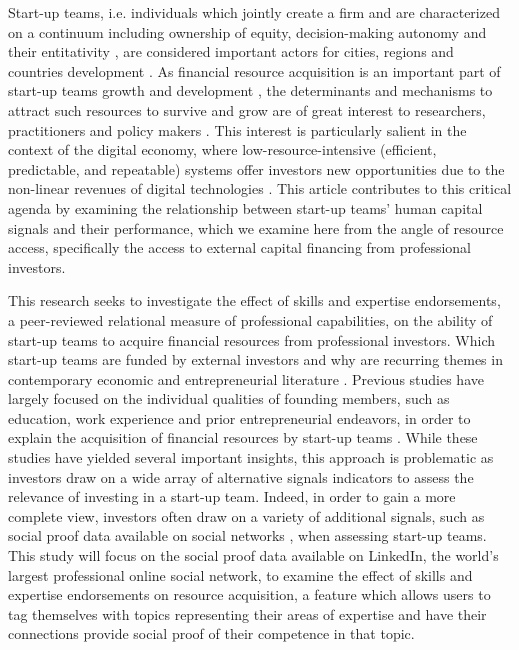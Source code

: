 \documentclass[12pt]{article}
\begin{document}
Start-up teams, i.e. individuals which jointly create a firm and are characterized on a continuum including ownership of equity, decision-making autonomy and their entitativity \citep{kamm1990entrepreneurial, knight2020start}, are considered important actors for cities, regions and countries development \citep{audretsch2001linking, autio2016entrepreneurship}. As financial resource acquisition is an important part of start-up teams growth and development \citep{rosenbusch2013does}, the determinants and mechanisms to attract such resources to survive and grow are of great interest to researchers, practitioners and policy makers \citep{EUcommission2015digital}. This interest is particularly salient in the context of the digital economy, where low-resource-intensive (efficient, predictable, and repeatable) systems offer investors new opportunities due to the non-linear revenues of digital technologies \citep{nambisan2017digital, sahut2021age}. This article contributes to this critical agenda by examining the relationship between start-up teams' human capital signals and their performance, which we examine here from the angle of resource access, specifically the access to external capital financing from professional investors.

This research seeks to investigate the effect of skills and expertise endorsements, a peer-reviewed relational measure of professional capabilities, on the ability of start-up teams to acquire financial resources from professional investors. Which start-up teams are funded by external investors and why are recurring themes in contemporary economic and entrepreneurial literature \citep{baum2004picking, beckman2007early, bernstein2017attracting, franke2006you, franke2008venture, plummer2016better, kaplan2009should, shane2002network}. Previous studies have largely focused on the individual qualities of founding members, such as education, work experience and prior entrepreneurial endeavors, in order to explain the acquisition of financial resources by start-up teams \citep{shane2002network, hsu2007experienced}. While these studies have yielded several important insights, this approach is problematic as investors draw on a wide array of alternative signals indicators to assess the relevance of investing in a start-up team. Indeed, in order to gain a more complete view, investors often draw on a variety of additional signals, such as social proof data available on social networks \citep{smith2017embracing, banerji2019startup}, when assessing start-up teams. This study will focus on the social proof data available on LinkedIn, the world's largest professional online social network, to examine the effect of skills and expertise endorsements on resource acquisition, a feature which allows users to tag themselves with topics representing their areas of expertise and have their connections provide social proof of their competence in that topic.
\end{document}

